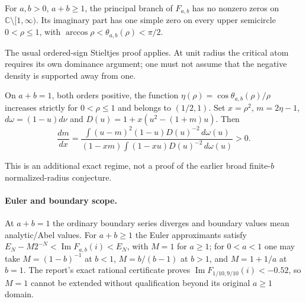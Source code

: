 \begin{corollary}
\label{realorder:cor:zeros}
For $a,b>0$, $a+b\ge1$, the principal branch of $F_{a,b}$ has no
nonzero zeros on $\mathbb C\setminus[1,\infty)$. Its imaginary part
has one simple zero on every upper semicircle $0<\rho\le1$, with
$\arccos\rho<\theta_{a,b}(\rho)<\pi/2$.
\end{corollary}
The usual ordered-sign Stieltjes proof applies. At unit radius the
critical atom requires its own dominance argument; one must not
assume that the negative density is supported away from one.

\begin{theorem}
\label{realorder:thm:radial}
On $a+b=1$, both orders positive, the function
$\eta(\rho)=\cos\theta_{a,b}(\rho)/\rho$ increases strictly for
$0<\rho\le1$ and belongs to $(1/2,1)$.
Set $x=\rho^2$, $m=2\eta-1$, $d\omega=(1-u)d\nu$ and
$D(u)=1+x(u^2-(1+m)u)$. Then
\[
 \frac{dm}{dx}=
 \frac{\displaystyle\int (u-m)^2(1-u)D(u)^{-2}\,d\omega(u)}
 {(1-xm)\displaystyle\int (1-xu)D(u)^{-2}\,d\omega(u)}>0.
\]
\end{theorem}
This is an additional exact regime, not a proof of the earlier broad
finite-$b$ normalized-radius conjecture.

\paragraph{Euler and boundary scope.}
At $a+b=1$ the ordinary boundary series diverges and boundary values
mean analytic/Abel values. For $a+b\ge1$ the Euler approximants satisfy
$E_N-M2^{-N}<\operatorname{Im}F_{a,b}(i)<E_N$, with $M=1$ for $a\ge1$;
for $0<a<1$ one may take $M=(1-b)^{-1}$ at $b<1$,
$M=b/(b-1)$ at $b>1$, and $M=1+1/a$ at $b=1$.
The report's exact rational certificate proves
$\operatorname{Im}F_{1/10,9/10}(i)<-0.52$, so $M=1$ cannot be
extended without qualification beyond its original $a\ge1$ domain.
